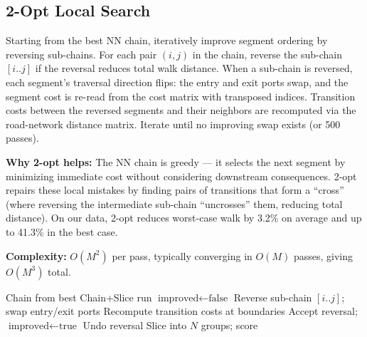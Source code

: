 \documentclass[conference]{IEEEtran}
\begin{document}
\subsection{2-Opt Local Search}

Starting from the best NN chain, iteratively improve segment ordering by reversing sub-chains. For each pair $(i, j)$ in the chain, reverse the sub-chain $[i..j]$ if the reversal reduces total walk distance. When a sub-chain is reversed, each segment's traversal direction flips: the entry and exit ports swap, and the segment cost is re-read from the cost matrix with transposed indices. Transition costs between the reversed segments and their neighbors are recomputed via the road-network distance matrix. Iterate until no improving swap exists (or 500 passes).

\textbf{Why 2-opt helps:} The NN chain is greedy --- it selects the next segment by minimizing immediate cost without considering downstream consequences. 2-opt repairs these local mistakes by finding pairs of transitions that form a ``cross'' (where reversing the intermediate sub-chain ``uncrosses'' them, reducing total distance). On our data, 2-opt reduces worst-case walk by 3.2\% on average and up to 41.3\% in the best case.

\textbf{Complexity:} $O(M^2)$ per pass, typically converging in $O(M)$ passes, giving $O(M^3)$ total.

\begin{algorithm}[htbp]
\caption{2-Opt Local Search}
\begin{algorithmic}[1]
\REQUIRE Chain from best Chain+Slice run
\REPEAT
    \STATE $\text{improved} \leftarrow \text{false}$
        \STATE Reverse sub-chain $[i..j]$; swap entry/exit ports
        \STATE Recompute transition costs at boundaries
            \STATE Accept reversal; $\text{improved} \leftarrow \text{true}$
        \ELSE
            \STATE Undo reversal
        \ENDIF
    \ENDFOR
{}
\STATE Slice into $N$ groups; score
\end{algorithmic}
\end{algorithm}
\end{document}
